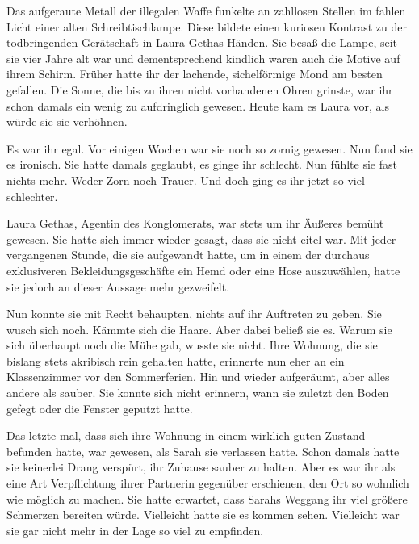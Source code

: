 Das aufgeraute Metall der illegalen Waffe funkelte an zahllosen Stellen im fahlen Licht einer alten Schreibtischlampe. Diese bildete einen kuriosen Kontrast zu der todbringenden Gerätschaft in Laura Gethas Händen. Sie besaß die Lampe, seit sie vier Jahre alt war und dementsprechend kindlich waren auch die Motive auf ihrem Schirm. Früher hatte ihr der lachende, sichelförmige Mond am besten gefallen. Die Sonne, die bis zu ihren nicht vorhandenen Ohren grinste, war ihr schon damals ein wenig zu aufdringlich gewesen. Heute kam es Laura vor, als würde sie sie verhöhnen.

\par

Es war ihr egal. Vor einigen Wochen war sie noch so zornig gewesen. Nun fand sie es ironisch. Sie hatte damals geglaubt, es ginge ihr schlecht. Nun fühlte sie fast nichts mehr. Weder Zorn noch Trauer. Und doch ging es ihr jetzt so viel schlechter.

\par

Laura Gethas, Agentin des Konglomerats, war stets um ihr Äußeres bemüht gewesen. Sie hatte sich immer wieder gesagt, dass sie nicht eitel war. Mit jeder vergangenen Stunde, die sie aufgewandt hatte, um in einem der durchaus exklusiveren Bekleidungsgeschäfte ein Hemd oder eine Hose auszuwählen, hatte sie jedoch an dieser Aussage mehr gezweifelt.

\par

Nun konnte sie mit Recht behaupten, nichts auf ihr Auftreten zu geben. Sie wusch sich noch. Kämmte sich die Haare. Aber dabei beließ sie es. Warum sie sich überhaupt noch die Mühe gab, wusste sie nicht. Ihre Wohnung, die sie bislang stets akribisch rein gehalten hatte, erinnerte nun eher an ein Klassenzimmer vor den Sommerferien. Hin und wieder aufgeräumt, aber alles andere als sauber. Sie konnte sich nicht erinnern, wann sie zuletzt den Boden gefegt oder die Fenster geputzt hatte.

\par

Das letzte mal, dass sich ihre Wohnung in einem wirklich guten Zustand befunden hatte, war gewesen, als Sarah sie verlassen hatte. Schon damals hatte sie keinerlei Drang verspürt, ihr Zuhause sauber zu halten. Aber es war ihr als eine Art Verpflichtung ihrer Partnerin gegenüber erschienen, den Ort so wohnlich wie möglich zu machen. Sie hatte erwartet, dass Sarahs Weggang ihr viel größere Schmerzen bereiten würde. Vielleicht hatte sie es kommen sehen. Vielleicht war sie gar nicht mehr in der Lage so viel zu empfinden.

